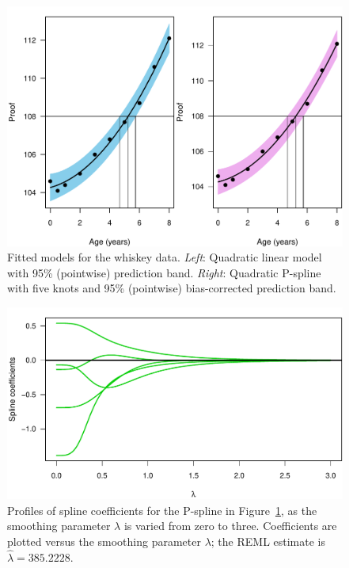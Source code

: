 \documentclass[cmfont,usenames,dvipsnames,leqno]{afit-etd}\usepackage[]{graphicx}\usepackage[]{color}
\makeatletter
\def\maxwidth{ %
  \ifdim\Gin@nat@width>\linewidth
    \linewidth
  \else
    \Gin@nat@width
  \fi
}
\newenvironment{knitrout}{}{} %
\renewenvironment{knitrout}{\begin{singlespace}}{\end{singlespace}}
\newcommand{\wh}[1]{\ensuremath{\widehat{#1}}}
\makeatother
\begin{document}
\begin{knitrout}
\color{fgcolor}\begin{figure}[H]

\includegraphics[width=\maxwidth]{figure/whiskey-calibration} \caption[Fitted  models for the whiskey data]{Fitted  models for the whiskey data. \textit{Left}: Quadratic linear model with 95\% (pointwise) prediction band. \textit{Right}: Quadratic P-spline with five knots and 95\% (pointwise) bias-corrected prediction band.\label{fig:whiskey-calibration}}
\end{figure}


\end{knitrout}


\begin{knitrout}
\color{fgcolor}\begin{figure}[H]

\includegraphics[width=\maxwidth]{figure/whiskey-paths} \caption[Spline coefficient paths for the whiskey example]{Profiles of spline coefficients for the P-spline in Figure~\ref{fig:whiskey-calibration}, as the smoothing parameter $\lambda$ is varied from zero to three. Coefficients are plotted versus the smoothing parameter $\lambda$; the REML estimate is $\wh{\lambda} = 385.2228$.\label{fig:whiskey-paths}}
\end{figure}


\end{knitrout}
\end{document}
